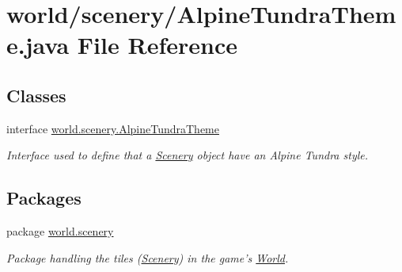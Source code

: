 \hypertarget{a00062}{\section{world/scenery/\-Alpine\-Tundra\-Theme.java File Reference}
\label{a00062}
}
\subsection*{Classes}
\begin{DoxyCompactItemize}
\item 
interface \hyperlink{a00002}{world.\-scenery.\-Alpine\-Tundra\-Theme}
\begin{DoxyCompactList}\small\item\em Interface used to define that a \hyperlink{a00024}{Scenery} object have an Alpine Tundra style. \end{DoxyCompactList}\end{DoxyCompactItemize}
\subsection*{Packages}
\begin{DoxyCompactItemize}
\item 
package \hyperlink{a00091}{world.\-scenery}
\begin{DoxyCompactList}\small\item\em Package handling the tiles (\hyperlink{a00024}{Scenery}) in the game's \hyperlink{a00039}{World}. \end{DoxyCompactList}\end{DoxyCompactItemize}
